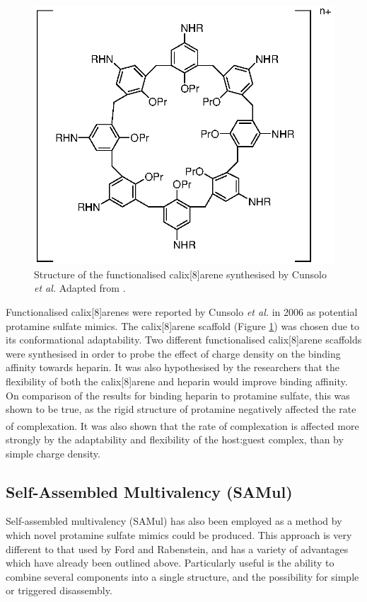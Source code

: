 \begin{figure} [h!]
\centering
\includegraphics[scale=0.75]{Figures/calix_8_arene.eps}
\caption{Structure of the functionalised calix[8]arene synthesised by Cunsolo \textit{et al.} Adapted from \cite{Mecca2006PolycationicHeparin}.}
\label{calix[8]arene_scaffold}
\end{figure}

Functionalised calix[8]arenes were reported by Cunsolo \textit{et al.} in 2006 as potential protamine sulfate mimics. The calix[8]arene scaffold (Figure \ref{calix[8]arene_scaffold}) was chosen due to its conformational adaptability. Two different functionalised calix[8]arene scaffolds were synthesised in order to probe the effect of charge density on the binding affinity towards heparin. It was also hypothesised by the researchers that the flexibility of both the calix[8]arene and heparin would improve binding affinity. 
On comparison of the results for binding heparin to protamine sulfate, this was shown to be true, as the rigid structure of protamine negatively affected the rate of complexation.\textsuperscript{\cite{Mecca2006PolycationicHeparin}} 
\newpage
It was also shown that the rate of complexation is affected more strongly by the adaptability and flexibility of the host:guest complex, than by simple charge density. 

\subsection{Self-Assembled Multivalency (SAMul)}
Self-assembled multivalency (SAMul) has also been employed as a method by which novel protamine sulfate mimics could be produced. This approach is very different to that used by Ford and Rabenstein, and has a variety of advantages which have already been outlined above. Particularly useful is the ability to combine several components into a single structure, and the possibility for simple or triggered disassembly. 

